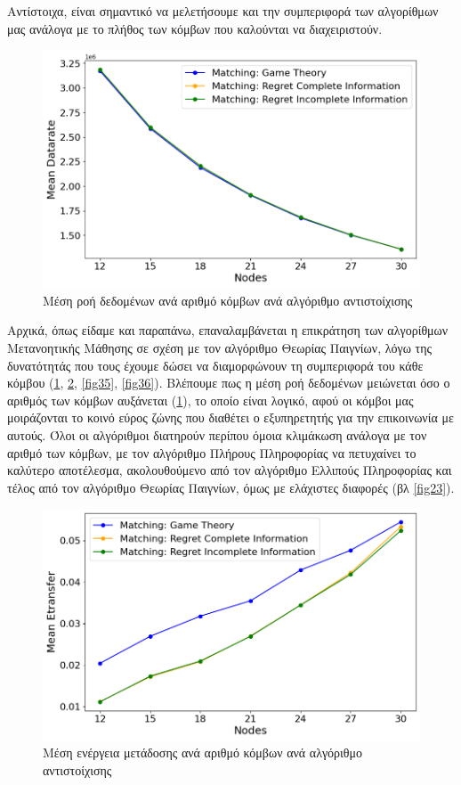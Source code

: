 Αντίστοιχα, είναι σημαντικό να μελετήσουμε και την συμπεριφορά των αλγορίθμων μας ανάλογα με το πλήθος των κόμβων που καλούνται να διαχειριστούν.

\begin{figure}[ht]
    \centering
    \includegraphics[width=\textwidth]{figures/chapter4/Mean_Datarate_vs_Users.png}
    \caption{Μέση ροή δεδομένων ανά αριθμό κόμβων ανά αλγόριθμο αντιστοίχισης}
    \label{fig33}
\end{figure}

Αρχικά, όπως είδαμε και παραπάνω, επαναλαμβάνεται η επικράτηση των αλγορίθμων Μετανοητικής Μάθησης σε σχέση με τον αλγόριθμο Θεωρίας Παιγνίων, λόγω της δυνατότητάς που τους έχουμε δώσει να διαμορφώνουν τη συμπεριφορά του κάθε κόμβου (\ref{fig33}, \ref{fig34}, \ref{fig35}, \ref{fig36}). Βλέπουμε πως η μέση ροή δεδομένων μειώνεται όσο ο αριθμός των κόμβων αυξάνεται (\ref{fig33}), το οποίο είναι λογικό, αφού οι κόμβοι μας μοιράζονται το κοινό εύρος ζώνης που διαθέτει ο εξυπηρετητής για την επικοινωνία με αυτούς. Όλοι οι αλγόριθμοι διατηρούν περίπου όμοια κλιμάκωση ανάλογα με τον αριθμό των κόμβων, με τον αλγόριθμο Πλήρους Πληροφορίας να πετυχαίνει το καλύτερο αποτέλεσμα, ακολουθούμενο από τον αλγόριθμο Ελλιπούς Πληροφορίας και τέλος από τον αλγόριθμο Θεωρίας Παιγνίων, όμως με ελάχιστες διαφορές (βλ \ref{fig23}). 

\begin{figure}[ht]
    \centering
    \includegraphics[width=\textwidth]{figures/chapter4/Mean_Etransfer_vs_Users.png}
    \caption{Μέση ενέργεια μετάδοσης ανά αριθμό κόμβων ανά αλγόριθμο αντιστοίχισης}
    \label{fig34}
\end{figure}

